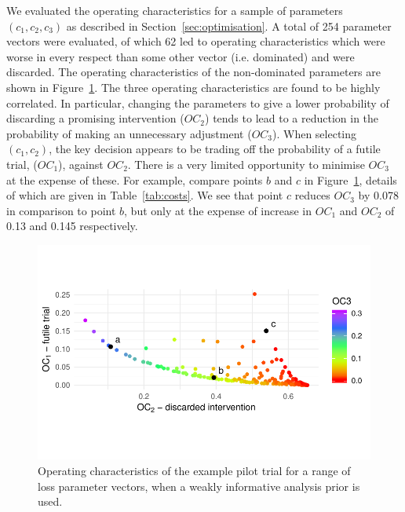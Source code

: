 \documentclass[AMA,STIX1COL]{WileyNJD-v2}
\begin{document}

We evaluated the operating characteristics for a sample of parameters $(c_1, c_2, c_3)$ as described in Section~\ref{sec:optimisation}. A total of 254 parameter vectors were evaluated, of which 62 led to operating characteristics which were worse in every respect than some other vector (i.e. dominated) and were discarded. The operating characteristics of the non-dominated parameters are shown in Figure~\ref{fig:p_front}. The three operating characteristics are found to be highly correlated. In particular, changing the parameters to give a lower probability of discarding a promising intervention ($OC_2$) tends to lead to a reduction in the probability of making an unnecessary adjustment ($OC_3$). When selecting $(c_1, c_2)$, the key decision appears to be trading off the probability of a futile trial, ($OC_{1}$), against $OC_{2}$. There is a very limited opportunity to minimise $OC_{3}$ at the expense of these. For example, compare points $b$ and $c$ in Figure~\ref{fig:p_front}, details of which are given in Table~\ref{tab:costs}. We see that point $c$ reduces $OC_3$ by 0.078 in comparison to point $b$, but only at the expense of increase in $OC_1$ and $OC_2$ of 0.13 and 0.145 respectively.

\begin{figure}
\centering
\includegraphics[scale=0.8]{./figures/p_front}
\caption{Operating characteristics of the example pilot trial for a range of loss parameter vectors, when a weakly informative analysis prior is used.}
\label{fig:p_front}
\end{figure}
\end{document}
